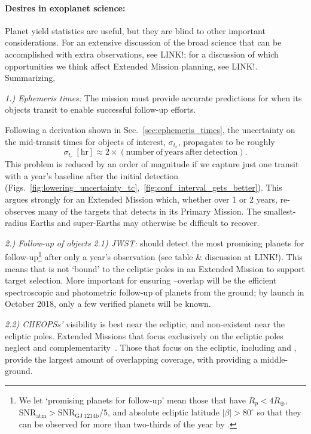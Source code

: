 \paragraph{Desires in exoplanet science:}
Planet yield statistics are useful, but they are blind to other important considerations. For an extensive discussion of the broad science that can be accomplished with extra \tess observations, see LINK!; for a discussion of which opportunities we think affect Extended Mission planning, see LINK!. Summarizing,

\textit{1.) Ephemeris times:}
The \tess mission must provide accurate predictions for when its objects transit to enable successful follow-up efforts.

Following a derivation shown in Sec.~\ref{sec:ephemeris_times},
the uncertainty on the mid-transit times for \tess objects of interest, $\sigma_{t_c}$, propagates to be roughly
$$\sigma_{t_c}\ \mathrm{[hr]} \approx 2\times\left(\mathrm{number\ of\ years\ after\ detection}\right). $$
This problem is reduced by an order of magnitude if we capture just one transit with a year's baseline after the initial detection (Figs.~\ref{fig:lowering_uncertainty_tc},~\ref{fig:conf_interval_gets_better}).
This argues strongly for an Extended Mission which, whether over 1 or 2 years, re-observes many of the targets that \tess detects in its Primary Mission. 
The smallest-radius Earths and super-Earths may otherwise be difficult to recover.

\textit{2.) Follow-up of \tess objects}\newline
\textit{2.1) JWST:} \tess should detect the most promising planets for \jwst follow-up\footnote{We let `promising planets for \jwst follow-up' mean those that have $R_p<4R_\oplus$, $\mathrm{SNR_{atm}} > \mathrm{SNR_{GJ\ 1214b}}/5$, and absolute ecliptic latitude $|\beta|>80^\circ$ so that they can be observed for more than two-thirds of the year by \jwst\!.} after only a year's observation (see table \& discussion at LINK!).
This means that \tess is not `bound' to the ecliptic poles in an Extended Mission to support \jwsts target selection.
More important for ensuring \jwst\!--\tess overlap will be the efficient spectroscopic and photometric follow-up of \tesss planets from the ground; by \jwsts launch in October 2018, only a few verified \tess planets will be known.

\textit{2.2) CHEOPSs'} visibility is best near the ecliptic, and non-existent near the ecliptic poles.
Extended Missions that focus exclusively on the ecliptic poles neglect \tess and \cheopss complementarity~\citep{berta_cheops_2016}.
Those that focus on the ecliptic, including \elong\:and \eshort, provide the largest amount of overlapping coverage, with \npole\:providing a middle-ground.

